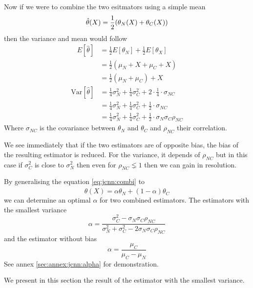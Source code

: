 \documentclass[../main.tex]{subfiles}
\begin{document}
Now if we were to combine the two esitmators using a simple mean
\begin{equation}
  \label{eq:jcnn:combi}
  \hat{\theta}(X) = \frac{1}{2} ( \theta_{N}(X) + \theta_{C}(X) ) \\
\end{equation}
then the variance and mean would follow
\begin{align}
  E[\hat{\theta}] & = \frac{1}{2}E[\theta_N] + \frac{1}{2}E[\theta_X]\\
                  & = \frac{1}{2}(\mu_N + X + \mu_C + X) \\
                  & = \frac{1}{2}(\mu_N + \mu_C) + X
\end{align}
\begin{align}
  \mathrm{Var}[\hat{\theta}] & = \frac{1}{4}\sigma^2_N + \frac{1}{4}\sigma^2_C + 2 \cdot \frac{1}{4} \cdot \sigma_{NC} \\
                             & = \frac{1}{4}\sigma^2_N + \frac{1}{4}\sigma^2_C + \frac{1}{2} \cdot \sigma_{NC} \\
                             & = \frac{1}{4}\sigma^2_N + \frac{1}{4}\sigma^2_C + \frac{1}{2} \cdot \sigma_{N} \sigma_C \rho_{NC}
\end{align}
Where $\sigma_{NC}$ is the covariance between $\theta_N$ and $\theta_C$ and $\rho_{NC}$ their correlation.

We see immediately that if the two estimators are of opposite bias, the bias of the resulting estimator is reduced. For the variance, it depends of $\rho_{NC}$ but in this case if $\sigma^2_C$ is close to $\sigma^2_N$ then even for $\rho_{NC} \lneq 1$ then we can gain in resolution.

By generalising the equation \ref{eq:jcnn:combi} to
\begin{equation}
  \hat{\theta}(X) = \alpha \theta_N + (1 - \alpha) \theta_C
\end{equation}
we can determine an optimal $\alpha$ for two combined estimators. The estimators with the smallest variance
\begin{equation}
  \alpha = \frac{\sigma_C^2 - \sigma_N \sigma_C \rho_{NC}}{\sigma_N^2 + \sigma_C^2 - 2\sigma_N \sigma_C \rho_{NC}}
\end{equation}
and the estimator without bias
\begin{equation}
  \alpha = \frac{\mu_C}{\mu_C - \mu_N}
\end{equation}
See annex \ref{sec:annex:jcnn:alpha} for demonstration.

We present in this section the result of the estimator with the smallest variance.
\end{document}

